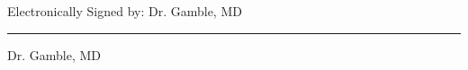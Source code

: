 \documentclass[11pt]{article}
\begin{document}
\vspace{35pt}


\begin{center}

Electronically Signed by:
Dr. Gamble, MD

\vspace{20pt}

\rule{4in}{0.5pt}

\vspace{12pt}

{\Large Dr. Gamble, MD}

\end{center}
\end{document}
